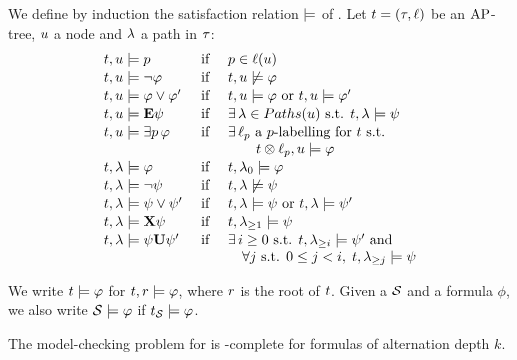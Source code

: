 \begin{definition}%
We define by induction the satisfaction relation $\models$ of
\QCTLs. Let   $t=(\tau,\ell)$ be
an $\textnormal{AP}$- tree, 
$u$  a node and $\tpath$  a path in $\tau$:
\[
\begin{array}{lcl}
  \ltree,\noeud\modelst p 			& \mbox{ if } & p\in\lab(\noeud)\\[1pt]
  \ltree,\noeud\modelst \neg \phi		& \mbox{ if } & \ltree,\noeud\not\modelst \phi\\[1pt]
  \ltree,\noeud\modelst \phi \ou \phi'		& \mbox{ if } & \ltree,\noeud \modelst \phi \mbox{ or    }\ltree,\noeud\modelst \phi' \\[1pt]
  \ltree,\noeud\modelst \E\psi			& \mbox{ if } & \exists\,\tpath\in\tPaths(\noeud) \mbox{      s.t. }\ltree,\tpath\modelst \psi \\[1pt]
  \ltree,\noeud\modelst \existsp \phi & \mbox{ if }
  & \exists\,\plab \mbox{ a $p$-\labeling for
    $\ltree$ s.t.
    }\\
  & & \quad \quad  \ltree\prodlab\plab,\noeud\modelst\phi\\[1pt]
\ltree,\tpath\modelst \phi 			& \mbox{ if } & \ltree,\tpath_{0}\modelst\phi \\[1pt] 
\ltree,\tpath\modelst \neg \psi 		& \mbox{ if }
&  \ltree,\tpath\not\modelst \psi \\[1pt] 
\ltree,\tpath\modelst \psi \ou \psi'			& \mbox{ if } & \ltree,\tpath \modelst \psi \mbox{ or }\ltree,\tpath\modelst \psi' \\[1pt] 
\ltree,\tpath\modelst \X\psi 				& \mbox{ if } & \ltree,\tpath_{\geq 1}\modelst \psi \\[1pt] 
\ltree,\tpath\modelst \psi\until\psi' 		& \mbox{ if }
& \exists\, i\geq 0 \mbox{ s.t.    }\ltree,\tpath_{\geq
                                                                i}\modelst\psi' \text{ and }\\
  & & \quad \forall j \text{ s.t. }0\leq j <i,\; \ltree,\tpath_{\geq j}\modelst\psi
\end{array}
\]
\end{definition}

We write $t\models\varphi$ for $t,r\models\varphi$,
where $r$ is the root of $t$.     Given a \KS $\KS$  and a
\QCTLs formula $\phi$, we also write $\KS\modelst\phi$ if
$\unfold[\KS]{\sstate}\modelst\phi$.

\begin{theorem}
  \label{theo-qctls}
  The model-checking problem for \QCTLs is \kEXPTIME[k+1]-complete for
  formulas of alternation depth $k$.
\end{theorem}

